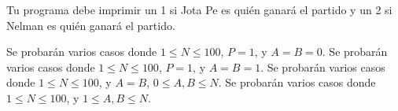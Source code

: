\documentclass{oci}
\begin{document}
\begin{outputDescription}
  Tu programa debe imprimir un 1 si Jota Pe es quién ganará el partido y un 2 si Nelman es quién ganará el partido.
\end{outputDescription}



\begin{scoreDescription}
   Se probarán varios casos donde $1 \le N \le 100$, $P=1$, y $A=B=0$.
   Se probarán varios casos donde $1 \le N \le 100$, $P=1$, y $A=B=1$.
   Se probarán varios casos donde $1 \le N \le 100$, y $A=B$, $0\le A,B \le N$.
   Se probarán varios casos donde $1 \le N \le 100$, y $1 \le A, B \le N$.
\end{scoreDescription}

\begin{sampleDescription}
\end{sampleDescription}
\end{document}
